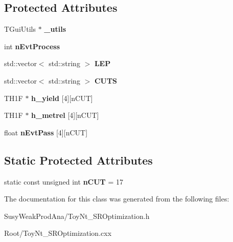 \subsection*{Protected Attributes}
\begin{DoxyCompactItemize}
\item 
\hypertarget{classToyNt__SROptimization_a3f06b0244a1b0e8dacbc35d1daa08765}{
TGuiUtils $\ast$ {\bfseries \_\-utils}}
\label{classToyNt__SROptimization_a3f06b0244a1b0e8dacbc35d1daa08765}

\item 
\hypertarget{classToyNt__SROptimization_a4381abdb03093cad7a730ca1bf458d70}{
int {\bfseries nEvtProcess}}
\label{classToyNt__SROptimization_a4381abdb03093cad7a730ca1bf458d70}

\item 
\hypertarget{classToyNt__SROptimization_ae194cc797fc31108bafe38aef5deaa30}{
std::vector$<$ std::string $>$ {\bfseries LEP}}
\label{classToyNt__SROptimization_ae194cc797fc31108bafe38aef5deaa30}

\item 
\hypertarget{classToyNt__SROptimization_a39542da3df86333acdb67ad79345afd6}{
std::vector$<$ std::string $>$ {\bfseries CUTS}}
\label{classToyNt__SROptimization_a39542da3df86333acdb67ad79345afd6}

\item 
\hypertarget{classToyNt__SROptimization_a7c6bb95cc7946272e0e5c132a0da86a3}{
TH1F $\ast$ {\bfseries h\_\-yield} \mbox{[}4\mbox{]}\mbox{[}nCUT\mbox{]}}
\label{classToyNt__SROptimization_a7c6bb95cc7946272e0e5c132a0da86a3}

\item 
\hypertarget{classToyNt__SROptimization_a9612615f5af1b6f942923be4420521ef}{
TH1F $\ast$ {\bfseries h\_\-metrel} \mbox{[}4\mbox{]}\mbox{[}nCUT\mbox{]}}
\label{classToyNt__SROptimization_a9612615f5af1b6f942923be4420521ef}

\item 
\hypertarget{classToyNt__SROptimization_aacd83262b61b8c2dad7be6180b2316de}{
float {\bfseries nEvtPass} \mbox{[}4\mbox{]}\mbox{[}nCUT\mbox{]}}
\label{classToyNt__SROptimization_aacd83262b61b8c2dad7be6180b2316de}

\end{DoxyCompactItemize}
\subsection*{Static Protected Attributes}
\begin{DoxyCompactItemize}
\item 
\hypertarget{classToyNt__SROptimization_a18f27bd4b1070edf728b79c3a138ba1b}{
static const unsigned int {\bfseries nCUT} = 17}
\label{classToyNt__SROptimization_a18f27bd4b1070edf728b79c3a138ba1b}

\end{DoxyCompactItemize}


The documentation for this class was generated from the following files:\begin{DoxyCompactItemize}
\item 
SusyWeakProdAna/ToyNt\_\-SROptimization.h\item 
Root/ToyNt\_\-SROptimization.cxx\end{DoxyCompactItemize}
